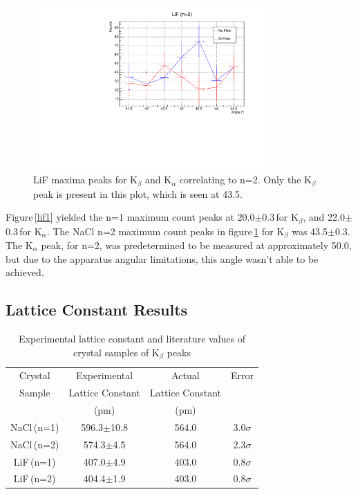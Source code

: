 \documentclass[aps,prl,twocolumn,superscriptaddress,nofootinbib]{revtex4-1}
\begin{document}
\begin{figure}[h!]
  \begin{center}
\centerline{\includegraphics[width=3.5in]{lif2.pdf}}
\caption{ \small{LiF maxima peaks for K$_\beta$ and K$_\alpha$ correlating to n=2. Only the K$_\beta$ peak is present in this plot, which is seen at 43.5\degree. \label{lif2}}}
  \end{center}
\end{figure}

Figure\,\ref{lif1} yielded the n=1 maximum count peaks at 20.0\degree$\pm$0.3\degree\,for K$_\beta$, and 22.0\degree$\pm$0.3\degree\,for K$_\alpha$. The NaCl n=2 maximum count peaks in figure\,\ref{lif2} for K$_\beta$ was 43.5\degree$\pm$0.3\degree. The K$_\alpha$ peak, for n=2, was predetermined to be measured at approximately 50.0\degree, but due to the apparatus angular limitations, this angle wasn't able to be achieved.
\vfill\eject


\subsection{Lattice Constant Results}
 \begin{table}[h!] 
\caption{Experimental lattice constant and literature values of crystal samples of K$_\beta$ peaks}
\label{t1}   %
 \begin{center}   %
    \begin{tabular}{|c|c|c|c|} \hline   %
Crystal  & Experimental & Actual & Error \\
 Sample   & Lattice Constant  & Lattice Constant &  \\
       & (pm)  & (pm) &   \\ \hline \hline \hline
NaCl\,(n=1) & 596.3$\pm$10.8 & 564.0 & 3.0$\sigma$ \\ \hline
NaCl\,(n=2) & 574.3$\pm$4.5 & 564.0 & 2.3$\sigma$ \\ \hline
LiF\,(n=1) & 407.0$\pm$4.9 & 403.0 & 0.8$\sigma$ \\ \hline
LiF\,(n=2) & 404.4$\pm$1.9 & 403.0 & 0.8$\sigma$ \\ \hline
     \end{tabular}
  \end{center}
\end{table}
\end{document}
